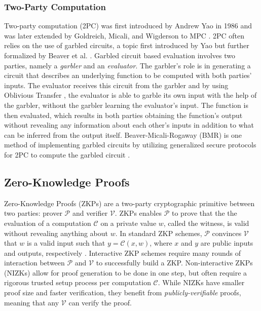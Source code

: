 \documentclass[9pt,sigconf,screen]{acmart}
\newcommand{\Prv}{$\mathcal{P}$\xspace}
\newcommand{\Vrf}{$\mathcal{V}$\xspace}
\newcommand{\Cir}{$\mathcal{C}$\xspace}
\newcommand\sys{$\mathsf{SPAM}$\xspace}
\begin{document}
\subsubsection{Two-Party Computation}
Two-party computation (2PC) was first introduced by Andrew Yao in 1986 and was later extended by Goldreich, Micali, and Wigderson to MPC \cite{2pc, mpc}. 2PC often relies on the use of garbled circuits, a topic first introduced by Yao but further formalized by Beaver et al. \cite{BMR}. Garbled circuit based evaluation involves two parties, namely a \textit{garbler} and an \textit{evaluator}. The garbler's role is in generating a circuit that describes an underlying function to be computed with both parties' inputs. The evaluator receives this circuit from the garbler and by using Oblivious Transfer \cite{OT}, the evaluator is able to garble its own input with the help of the garbler, without the garbler learning the evaluator's input. The function is then evaluated, which results in both parties obtaining the function's output without revealing any information about each other's inputs in addition to what can be inferred from the output itself. Beaver-Micali-Rogaway (BMR) is one method of implementing garbled circuits by utilizing generalized secure protocols for 2PC to compute the garbled circuit \cite{BMR}. 


\subsection{Zero-Knowledge Proofs}
Zero-Knowledge Proofs (ZKPs) are a two-party cryptographic primitive between two parties: prover \Prv and verifier \Vrf. ZKPs enables \Prv to prove that the the evaluation of a computation \Cir on a private value $w$, called the witness, is valid without revealing anything about $w$. In standard ZKP schemes, \Prv convinces \Vrf that $w$ is a valid input such that $y=\mathcal{C}(x,w)$, where $x$ and $y$ are public inputs and outputs, respectively \cite{zk}.
Interactive ZKP schemes require many rounds of interaction between \Prv and \Vrf to successfully build a ZKP. Non-interactive ZKPs (NIZKs) allow for proof generation to be done in one step, but often require a rigorous trusted setup process per computation \Cir. While NIZKs have smaller proof size and faster verification, they benefit from \textit{publicly-verifiable} proofs, meaning that any \Vrf can verify the proof. 
\end{document}
